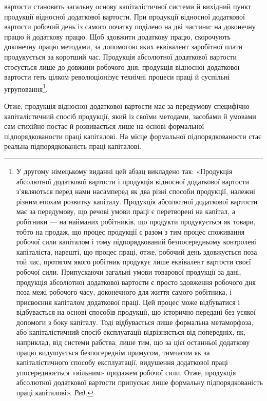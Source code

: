 \parcont{}  %
вартости становить загальну основу капіталістичної системи
й вихідний пункт продукції відносної додаткової вартости. При
продукції відносної додаткової вартости робочий день із самого
початку поділено на дві частини: на доконечну працю й додаткову
працю. Щоб здовжити додаткову працю, скорочують доконечну
працю методами, за допомогою яких еквівалент заробітної
плати продукується за коротший час. Продукція абсолютної
додаткової вартости стосується лише до довжини робочого дня;
продукція відносної додаткової вартости геть цілком революціонізує
технічні процеси праці й суспільні угруповання\footnote*{
У другому німецькому виданні цей абзац викладено так: «Продукція
абсолютної додаткової вартости і продукція відносної додаткової
вартости з’являються перед нами насамперед як два різні способи продукції,
належні різним епохам розвитку капіталу. Продукція абсолютної
додаткової вартости має за передумову, що речові умови праці є перетворені
на капітал, а робітники — на найманих робітників, що продукти
продукується як товари, тобто на продаж, що процес продукції є разом
з тим процес споживання робочої сили капіталом і тому підпорядкований
безпосередньому контролеві капіталіста, нарешті, що процес праці, отже,
робочий день здовжується поза той час, протягом якого робітник продукує
лише еквівалент вартости своєї робочої сили. Припускаючи загальні
умови товарової продукції за дані, продукція абсолютної додаткової вартости
є просто здовження робочого дня поза межі робочого часу, доконечного
для життя самого робітника, і присвоєння капіталом додаткової
праці. Цей процес може відбуватися і відбувається на основі способів
продукції, що історично передані без усякої допомоги з боку капіталу.
Тоді відбувається лише формальна метаморфоза, або капіталістичний
спосіб експлуатації відрізняється від попередніх, як, наприклад, від
системи рабства, лише тим, що за цієї останньої додаткову працю видушується
безпосереднім примусом, тимчасом як за капіталістичного способу
експлуатації, видушення додаткової праці упосереднюється «вільним»
продажем робочої сили. Отже, продукція абсолютної додаткової
вартости припускає лише формальну підпорядкованість праці капіталові». \emph{Ред.}
}.

Отже, продукція відносної додаткової вартости має за передумову
специфічно капіталістичний спосіб продукції, який із
своїми методами, засобами й умовами сам стихійно постає й розвивається
лише на основі формальної підпорядкованости праці
капіталові. На місце формальної підпорядкованости стає реальна
підпорядкованість праці капіталові.


